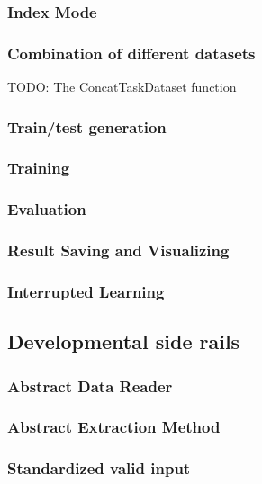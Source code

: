 \subsubsection{Index Mode}

\subsubsection{Combination of different datasets}
TODO: The ConcatTaskDataset function

\subsubsection{Train/test generation}

\subsubsection{Training}

\subsubsection{Evaluation}

\subsubsection{Result Saving and Visualizing}

\subsubsection{Interrupted Learning}

\subsection{Developmental side rails}

\subsubsection{Abstract Data Reader}

\subsubsection{Abstract Extraction Method}

\subsubsection{Standardized valid input}

